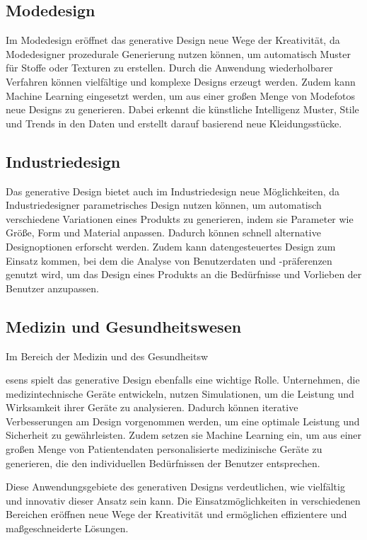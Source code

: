 \subsection{Modedesign}

Im Modedesign eröffnet das generative Design neue Wege der Kreativität, da Modedesigner prozedurale Generierung nutzen können, um automatisch Muster für Stoffe oder Texturen zu erstellen. Durch die Anwendung wiederholbarer Verfahren können vielfältige und komplexe Designs erzeugt werden. Zudem kann Machine Learning eingesetzt werden, um aus einer großen Menge von Modefotos neue Designs zu generieren. Dabei erkennt die künstliche Intelligenz Muster, Stile und Trends in den Daten und erstellt darauf basierend neue Kleidungsstücke.

\subsection{Industriedesign}

Das generative Design bietet auch im Industriedesign neue Möglichkeiten, da Industriedesigner parametrisches Design nutzen können, um automatisch verschiedene Variationen eines Produkts zu generieren, indem sie Parameter wie Größe, Form und Material anpassen. Dadurch können schnell alternative Designoptionen erforscht werden. Zudem kann datengesteuertes Design zum Einsatz kommen, bei dem die Analyse von Benutzerdaten und -präferenzen genutzt wird, um das Design eines Produkts an die Bedürfnisse und Vorlieben der Benutzer anzupassen.

\subsection{Medizin und Gesundheitswesen}

Im Bereich der Medizin und des Gesundheitsw

esens spielt das generative Design ebenfalls eine wichtige Rolle. Unternehmen, die medizintechnische Geräte entwickeln, nutzen Simulationen, um die Leistung und Wirksamkeit ihrer Geräte zu analysieren. Dadurch können iterative Verbesserungen am Design vorgenommen werden, um eine optimale Leistung und Sicherheit zu gewährleisten. Zudem setzen sie Machine Learning ein, um aus einer großen Menge von Patientendaten personalisierte medizinische Geräte zu generieren, die den individuellen Bedürfnissen der Benutzer entsprechen.

Diese Anwendungsgebiete des generativen Designs verdeutlichen, wie vielfältig und innovativ dieser Ansatz sein kann. Die Einsatzmöglichkeiten in verschiedenen Bereichen eröffnen neue Wege der Kreativität und ermöglichen effizientere und maßgeschneiderte Lösungen.